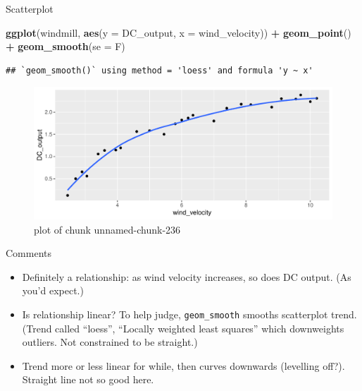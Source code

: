 \documentclass[ignorenonframetext,]{beamer}
\newenvironment{Shaded}{\begin{snugshade}}{\end{snugshade}}
\newcommand{\DataTypeTok}[1]{\textcolor[rgb]{0.13,0.29,0.53}{#1}}
\newcommand{\KeywordTok}[1]{\textcolor[rgb]{0.13,0.29,0.53}{\textbf{#1}}}
\newcommand{\NormalTok}[1]{#1}
\newcommand{\OperatorTok}[1]{\textcolor[rgb]{0.81,0.36,0.00}{\textbf{#1}}}
\newcommand{\StringTok}[1]{\textcolor[rgb]{0.31,0.60,0.02}{#1}}
\providecommand{\tightlist}{%
  \setlength{\itemsep}{0pt}\setlength{\parskip}{0pt}}
\begin{document}
\begin{frame}[fragile]{Scatterplot}
\protect\hypertarget{scatterplot}{}

\begin{Shaded}
\begin{Highlighting}[]
\KeywordTok{ggplot}\NormalTok{(windmill, }\KeywordTok{aes}\NormalTok{(}\DataTypeTok{y =}\NormalTok{ DC_output, }\DataTypeTok{x =}\NormalTok{ wind_velocity)) }\OperatorTok{+}
\StringTok{  }\KeywordTok{geom_point}\NormalTok{() }\OperatorTok{+}\StringTok{ }\KeywordTok{geom_smooth}\NormalTok{(}\DataTypeTok{se =}\NormalTok{ F)}
\end{Highlighting}
\end{Shaded}

\begin{verbatim}
## `geom_smooth()` using method = 'loess' and formula 'y ~ x'
\end{verbatim}

\begin{figure}
\centering
\includegraphics{figure/unnamed-chunk-236-1.pdf}
\caption{plot of chunk unnamed-chunk-236}
\end{figure}

\end{frame}

\begin{frame}[fragile]{Comments}
\protect\hypertarget{comments-12}{}

\begin{itemize}
\tightlist
\item
  Definitely a relationship: as wind velocity increases, so does DC
  output. (As you'd expect.)
\item
  Is relationship linear? To help judge, \texttt{geom\_smooth} smooths
  scatterplot trend. (Trend called ``loess'', ``Locally weighted least
  squares'' which downweights outliers. Not constrained to be straight.)
\item
  Trend more or less linear for while, then curves downwards (levelling
  off?). Straight line not so good here.
\end{itemize}

\end{frame}
\end{document}
